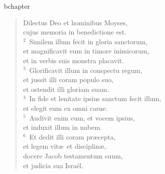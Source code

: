 bchapter\begin{verse}\vspace{-19pt}Dilectus Deo et hominibus Moyses,\\ cujus memoria in benedictione est.\\
${}^{2}$~Similem illum fecit in gloria sanctorum,\\ et magnificavit eum in timore inimicorum,\\ et in verbis suis monstra placavit.\\
${}^{3}$~Glorificavit illum in conspectu regum,\\ et jussit illi coram populo suo,\\ et ostendit illi gloriam suam.\\
${}^{4}$~In fide et lenitate ipsius sanctum fecit illum,\\ et elegit eum ex omni carne.\\
${}^{5}$~Audivit enim eum, et vocem ipsius,\\ et induxit illum in nubem.\\
${}^{6}$~Et dedit illi coram pr\ae cepta,\\ et legem vit\ae\ et disciplin\ae ,\\ docere Jacob testamentum suum,\\ et judicia sua Isra\"el.\end{verse}


